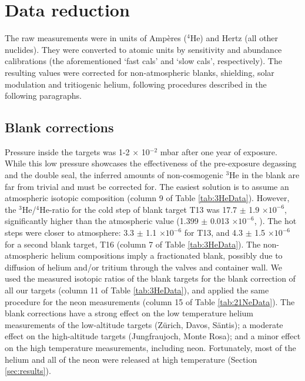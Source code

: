 \documentclass{article}
\begin{document}
\section{Data reduction}\label{sec:datareduction}

The raw measurements  were in units of Amp\`{e}res  ($^4$He) and Hertz
(all  other  nuclides).  They   were  converted  to  atomic  units  by
sensitivity and abundance calibrations (the aforementioned `fast cals'
and `slow  cals', respectively).  The resulting  values were corrected
for   non-atmospheric   blanks,   shielding,  solar   modulation   and
tritiogenic  helium, following procedures  described in  the following
paragraphs.

\subsection{Blank corrections}\label{sec:blank}

Pressure inside the targets was  1-2 $\times$ 10$^{-2}$ mbar after one
year of exposure.  While this low pressure showcases the effectiveness
of  the  pre-exposure degassing  and  the  double  seal, the  inferred
amounts of non-cosmogenic $^3$He in the blank are far from trivial and
must  be  corrected  for.   The  easiest  solution  is  to  assume  an
atmospheric    isotopic    composition     (column    9    of    Table
\ref{tab:3HeData}).   However, the  $^3$He/$^4$He-ratio  for the  cold
step  of  blank  target   T13  was  17.7  $\pm$  1.9  $\times10^{-6}$,
significantly  higher than  the atmospheric  value (1.399  $\pm$ 0.013
$\times10^{-6}$, \citet{porcelli2002}).  The  hot steps were closer to
atmosphere: 3.3 $\pm$  1.1 $\times10^{-6}$ for T13, and  4.3 $\pm$ 1.5
$\times10^{-6}$  for a  second blank  target, T16  (column 7  of Table
\ref{tab:3HeData}).  The  non-atmospheric helium compositions  imply a
fractionated blank, possibly due to diffusion of helium and/or tritium
\citep{tilles1962} through the valves and container wall.  We used the
measured isotopic ratios of the blank targets for the blank correction
of all our targets (column 11 of Table \ref{tab:3HeData}), and applied
the  same procedure  for the  neon  measurements (column  15 of  Table
\ref{tab:21NeData}).  The  blank corrections  have a strong  effect on
the low  temperature helium  measurements of the  low-altitude targets
(Z\"{u}rich,   Davos,   S\"{a}ntis);   a   moderate  effect   on   the
high-altitude targets  (Jungfraujoch, Monte Rosa); and  a minor effect
on  the high temperature  measurements, including  neon.  Fortunately,
most  of  the  helium and  all  of  the  neon  were released  at  high
temperature (Section \ref{sec:results}).
\end{document}
